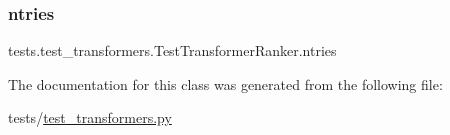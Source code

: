 \subsubsection{\texorpdfstring{ntries}{ntries}}
{\footnotesize\ttfamily tests.\+test\+\_\+transformers.\+Test\+Transformer\+Ranker.\+ntries\hspace{0.3cm}{\ttfamily [static]}}



The documentation for this class was generated from the following file\+:\begin{DoxyCompactItemize}
\item 
tests/\hyperlink{test__transformers_8py}{test\+\_\+transformers.\+py}\end{DoxyCompactItemize}
